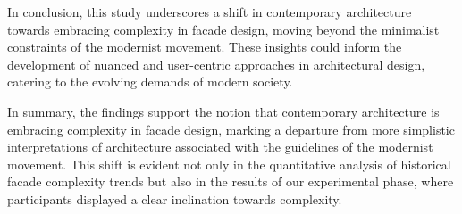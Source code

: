 In conclusion, this study underscores a shift in contemporary architecture towards embracing complexity in facade design, moving beyond the minimalist constraints of the modernist movement.
These insights could inform the development of nuanced and user-centric approaches in architectural design, catering to the evolving demands of modern society.






In summary, the findings support the notion that contemporary architecture is embracing complexity in facade design, marking a departure from more simplistic interpretations of architecture associated with the guidelines of the modernist movement.
This shift is evident not only in the quantitative analysis of historical facade complexity trends but also in the results of our experimental phase, where participants displayed a clear inclination towards complexity.
